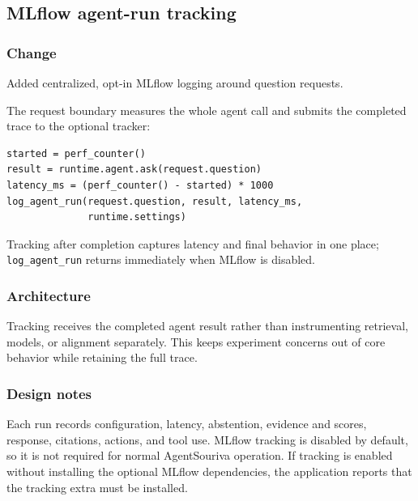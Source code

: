 
\subsection{MLflow agent-run tracking}


\subsubsection{Change}

Added centralized, opt-in MLflow logging around question requests.

The request boundary measures the whole agent call and submits the completed trace to the optional tracker:

\begin{verbatim}
started = perf_counter()
result = runtime.agent.ask(request.question)
latency_ms = (perf_counter() - started) * 1000
log_agent_run(request.question, result, latency_ms,
              runtime.settings)
\end{verbatim}

Tracking after completion captures latency and final behavior in one place; \texttt{log\_agent\_run} returns immediately when MLflow is disabled.

\subsubsection{Architecture}

Tracking receives the completed agent result rather than instrumenting retrieval, models, or alignment separately. This keeps experiment concerns out of core behavior while retaining the full trace.

\subsubsection{Design notes}

Each run records configuration, latency, abstention, evidence and scores, response, citations, actions, and tool use. MLflow tracking is disabled by default, so it is not required for normal AgentSouriva operation. If tracking is enabled without installing the optional MLflow dependencies, the application reports that the tracking extra must be installed.

